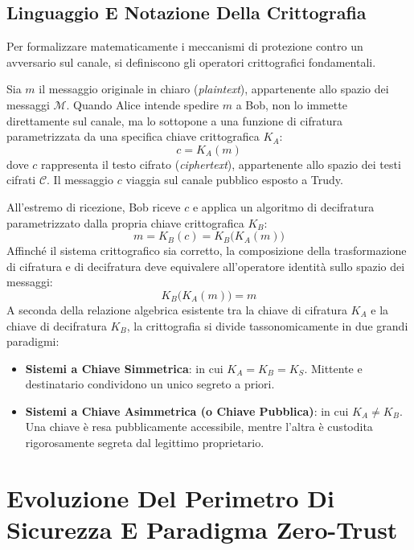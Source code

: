 \documentclass[11pt, a4paper]{article}
\begin{document}
\subsection{Linguaggio E Notazione Della Crittografia}

Per formalizzare matematicamente i meccanismi di protezione contro un avversario sul canale, si definiscono gli operatori crittografici fondamentali.


Sia $m$ il messaggio originale in chiaro (\emph{plaintext}), appartenente allo spazio dei messaggi $\mathcal{M}$. Quando Alice intende spedire $m$ a Bob, non lo immette direttamente sul canale, ma lo sottopone a una funzione di cifratura parametrizzata da una specifica chiave crittografica $K_A$:
\[
c = K_A(m)
\]
dove $c$ rappresenta il testo cifrato (\emph{ciphertext}), appartenente allo spazio dei testi cifrati $\mathcal{C}$. Il messaggio $c$ viaggia sul canale pubblico esposto a Trudy.

All'estremo di ricezione, Bob riceve $c$ e applica un algoritmo di decifratura parametrizzato dalla propria chiave crittografica $K_B$:
\[
m = K_B(c) = K_B\bigl(K_A(m)\bigr)
\]
Affinché il sistema crittografico sia corretto, la composizione della trasformazione di cifratura e di decifratura deve equivalere all'operatore identità sullo spazio dei messaggi:
\begin{equation}
\boxed{K_B\bigl(K_A(m)\bigr) = m}
\end{equation}
A seconda della relazione algebrica esistente tra la chiave di cifratura $K_A$ e la chiave di decifratura $K_B$, la crittografia si divide tassonomicamente in due grandi paradigmi:
\begin{itemize}[leftmargin=*]
    \item \textbf{Sistemi a Chiave Simmetrica}: in cui $K_A = K_B = K_S$. Mittente e destinatario condividono un unico segreto a priori.
    \item \textbf{Sistemi a Chiave Asimmetrica (o Chiave Pubblica)}: in cui $K_A \neq K_B$. Una chiave è resa pubblicamente accessibile, mentre l'altra è custodita rigorosamente segreta dal legittimo proprietario.
\end{itemize}

\newpage

\section{Evoluzione Del Perimetro Di Sicurezza E Paradigma Zero-Trust}
\end{document}
